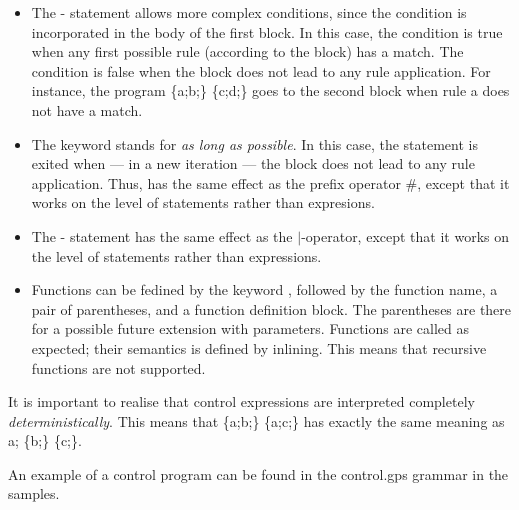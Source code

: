 \begin{itemize}
\item The \tryK-\elseK{} statement allows more complex conditions, since the
  condition is incorporated in the body of the first block. In this case, the
  condition is true when any first possible rule (according to the block) has a
  match. The condition is false when the block does not lead to any rule
  application.  For instance, the program \textsf{\tryK{} \{a;b;\}
  \elseK{} \{c;d;\}} goes to the second block when rule \textsf{a}
  does not have a match.

\item The \alapK{} keyword stands for \emph{as long as possible}. In this case,
  the statement is exited when --- in a new iteration --- the block does not
  lead to any rule application. Thus, \alapK{} has the same effect as the
  prefix operator \textsf{\#}, except that it works on the level of statements
  rather than expresions.

\item The \choiceK-\doK{} statement has the same effect as the
  \textsf{$|$}-operator, except that it works on the level of statements rather
  than expressions.

\item Functions can be fedined by the keyword \functionK, followed by the
  function name, a pair of parentheses, and a function definition block. The
  parentheses are there for a possible future extension with
  parameters. Functions are called as expected; their semantics is defined by
  inlining. This means that recursive functions are not supported.
\end{itemize}
%
It is important to realise that control expressions are interpreted completely
\emph{deterministically}. This means that \textsf{\choiceK{} \{a;b;\} \orK{}
\{a;c;\}} has exactly the same meaning as \textsf{a; \choiceK{} \{b;\} \orK{}
\{c;\}}.

An example of a control program can be found in the \textsf{control.gps}
grammar in the \GROOVE samples.
